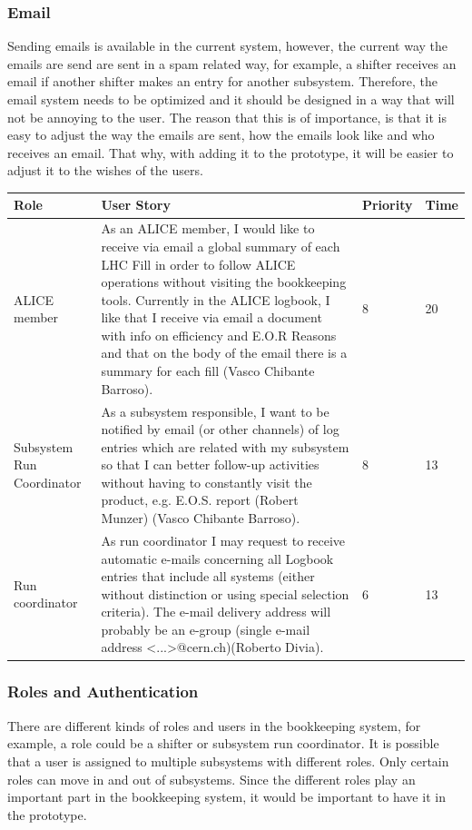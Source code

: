 \documentclass[paper=a4, fontsize=11pt,twoside]{scrartcl}	%
\begin{document}
\subsubsection{Email}
Sending emails is available in the current system, however, the current way the emails are send are sent in a spam related way, for example, a shifter receives an email if another shifter makes an entry for another subsystem. Therefore, the email system needs to be optimized and it should be designed in a way that will not be annoying to the user. The reason that this is of importance, is that it is easy to adjust the way the emails are sent, how the emails look like and who receives an email. That why, with adding it to the prototype, it will be easier to adjust it to the wishes of the users.
\begin{longtable}{| p{3cm} | p{8cm} | p{1.5cm} | l |}
\hline
Role & User Story & Priority & Time \\ \hline
ALICE member & As an ALICE member, I would like to receive via email a global summary of each LHC Fill in order to follow ALICE operations without visiting the bookkeeping tools. Currently in the ALICE logbook, I like that I receive via email a document with info on efficiency and E.O.R Reasons and that on the body of the email there is a summary for
each fill (Vasco Chibante Barroso). & 8 & 20 \\ \hline
Subsystem Run Coordinator &  As a subsystem responsible, I want to be notified by email (or other
channels) of log entries which are related with my subsystem so that I can better follow-up activities without having to constantly visit the product, e.g. E.O.S. report (Robert Munzer) (Vasco Chibante Barroso). & 8 & 13 \\ \hline
Run coordinator & As run coordinator I may request to receive automatic e-mails concerning all Logbook entries that include all systems (either without distinction or using special selection criteria). The e-mail delivery address will probably be an e-group (single e-mail address <...>@cern.ch)(Roberto Divia). & 6 & 13 \\ \hline
\end{longtable}

\newpage
\subsubsection{Roles and Authentication}
There are different kinds of roles and users in the bookkeeping system, for example, a role could be a shifter or subsystem run coordinator. It is possible that a user is assigned to multiple subsystems with different roles. Only certain roles can move in and out of subsystems. Since the different roles play an important part in the bookkeeping system, it  would be important to have it in the prototype.
\end{document}
